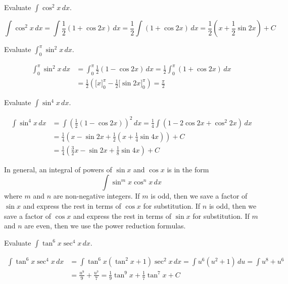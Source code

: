 \begin{problem}
    Evaluate \(\displaystyle{\int\cos^2 x\,dx}\).
\end{problem}
\begin{solution}
    \[\int\cos^2 x\,dx=\int\frac{1}{2}(1+\cos 2x)\,dx
    =\frac{1}{2}\int(1+\cos 2x)\,dx
    =\frac{1}{2}\left(x+\frac{1}{2}\sin 2x\right)+C\]
\end{solution}
\begin{problem}
    Evaluate \(\displaystyle{\int_0^\pi\sin^2 x\,dx}\).
\end{problem}
\begin{solution}
    \begin{align*}
    \int_0^\pi\sin^2 x\,dx &= \int_0^\pi\frac{1}{2}(1-\cos 2x)\,dx
    =\frac{1}{2}\int_0^{\pi}(1+\cos 2x)\,dx \\
    &=\frac{1}{2}
    \left(\big[x\big]_0^\pi-\frac{1}{2}\big[\sin 2x\big]_0^\pi\right)
    =\frac{\pi}{2}
    \end{align*}
\end{solution}
\begin{problem}
    Evaluate \(\displaystyle{\int\sin^4 x\,dx}\).
\end{problem}
\begin{solution}
    \begin{align*}
        \int\sin^4 x\,dx &= \int\left(\frac{1}{2}(1-\cos 2x)\right)^2\,dx
        =\frac{1}{4}\int(1-2\cos 2x+\cos^2 2x)\,dx \\
        &= \frac{1}{4}
        \left(x-\sin 2x+\frac{1}{2}
        \left(x+\frac{1}{4}\sin 4x\right)\right)+C \\
        &= \frac{1}{4}
        \left(\frac{3}{2}x-\sin 2x+\frac{1}{8}\sin 4x\right)+C
    \end{align*}
\end{solution}
In general, an integral of powers of \(\sin x\) and \(\cos x\) is in the
form
\[\int\sin^m x\cos^n x\,dx\]
where \(m\) and \(n\) are non-negative integers.
If \(m\) is odd, then we save a factor of \(\sin x\) and express the rest in
terms of \(\cos x\) for substitution.
If \(n\) is odd, then we save a factor of \(\cos x\) and express the rest in
terms of \(\sin x\) for substitution.
If \(m\) and \(n\) are even, then we use the power reduction formulas.
\begin{problem}
    Evaluate \(\displaystyle{\int\tan^6 x\sec^4 x\,dx}\).
\end{problem}
\begin{solution}
    \begin{align*}
        \int\tan^6 x\sec^4 x\,dx &= \int\tan^6 x(\tan^2 x+1)\sec^2 x\,dx
        =\int u^6(u^2+1)\,du=\int u^8+u^6 \\
        & =\frac{u^9}{9}+\frac{u^7}{7}
        =\frac{1}{9}\tan^9 x+\frac{1}{7}\tan^7 x+C
    \end{align*}
\end{solution}
